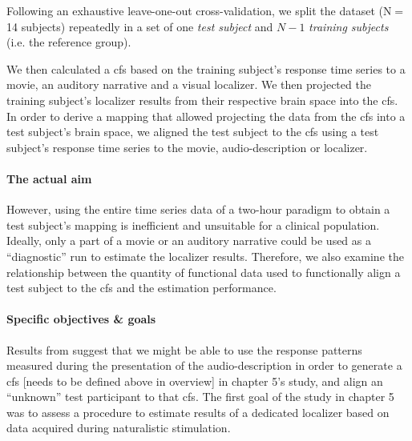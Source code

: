 




%
Following an exhaustive leave-one-out cross-validation, we split the dataset
(N$=$14 subjects) repeatedly in a set of one \textit{test subject} and $N-1$
\textit{training subjects} (i.e.  the reference group).


%
We then calculated a \ac{cfs} based on the training subject's response time
series to a movie, an auditory narrative and a visual localizer.
%
We then projected the training subject's localizer results from their respective
brain space into the \ac{cfs}.
%
In order to derive a mapping that allowed projecting the data from the \ac{cfs}
into a test subject's brain space, we aligned the test subject to the \ac{cfs}
using a test subject's response time series to the movie, audio-description or
localizer.
%



\paragraph{The actual aim}



However, using the entire time series data of a two-hour paradigm to obtain
a test subject's mapping is inefficient and unsuitable for a clinical
population.
%
Ideally, only a part of a movie or an auditory narrative could be used as a
``diagnostic'' run to estimate the localizer results.
%
Therefore, we also examine the relationship between the quantity of functional
data used to functionally align a test subject to the \ac{cfs} and the
estimation performance.


\paragraph{Specific objectives \& goals}
%
Results from \citet{haeusler2022processing} suggest that we might be able
to use the response patterns measured during the presentation of the
audio-description in order to generate a \ac{cfs} [needs to be defined above in
overview] in chapter 5's study, and align an ``unknown'' test participant to
that \ac{cfs}.
%
The first goal of the study in chapter 5 was to assess a procedure to
estimate results of a dedicated localizer \citep{sengupta2016extension} based on
data acquired during naturalistic stimulation.

